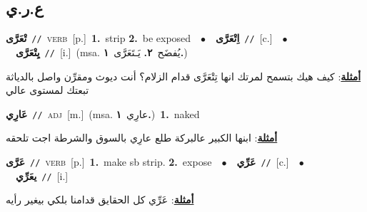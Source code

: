 \documentclass[10pt,a4paper,twoside]{article} %
\begin{document}
\begin{multicols}{2}
\vspace{-3mm}
\subsection*{\color{blue}\foreignlanguage{arabic}{ع.ر.ي}\color{blue}{}} 

{\setlength\topsep{0pt}\textbf{\foreignlanguage{arabic}{تْعَرَّى}}\ {\color{gray}\texttt{//}\color{black}}\ \textsc{verb}\ [p.]\ \textbf{1.}~strip  \textbf{2.}~be exposed\ \ $\bullet$\ \ \setlength\topsep{0pt}\textbf{\foreignlanguage{arabic}{اِتْعَرَّى}}\ {\color{gray}\texttt{//}\color{black}}\ [c.]\ \ $\bullet$\ \ \setlength\topsep{0pt}\textbf{\foreignlanguage{arabic}{يِتْعَرَّى}}\ {\color{gray}\texttt{//}\color{black}}\ [i.]\ \color{gray}(msa. \foreignlanguage{arabic}{يُفضَح}~\foreignlanguage{arabic}{\textbf{٢.}}  \foreignlanguage{arabic}{يَـتَعَرَّى}~\foreignlanguage{arabic}{\textbf{١.}})\color{black}\  \begin{flushright}\color{gray}\foreignlanguage{arabic}{\textbf{\underline{\foreignlanguage{arabic}{أمثلة}}}: كيف هيك بتسمح لمرتك انها تِتْعَرَّى قدام الزلام؟ أنت ديوث ومقرِّن واصل بالدياثة تبعتك لمستوى عالي}\end{flushright}\color{black}} \vspace{2mm}

{\setlength\topsep{0pt}\textbf{\foreignlanguage{arabic}{عَارِي}}\ {\color{gray}\texttt{//}\color{black}}\ \textsc{adj}\ [m.]\ \color{gray}(msa. \foreignlanguage{arabic}{عارِي}~\foreignlanguage{arabic}{\textbf{١.}})\color{black}\ \textbf{1.}~naked\  \begin{flushright}\color{gray}\foreignlanguage{arabic}{\textbf{\underline{\foreignlanguage{arabic}{أمثلة}}}: ابنها الكبير عالبركة طلع عارِي بالسوق والشرطة اجت تلحقه}\end{flushright}\color{black}} \vspace{2mm}

{\setlength\topsep{0pt}\textbf{\foreignlanguage{arabic}{عَرَّى}}\ {\color{gray}\texttt{//}\color{black}}\ \textsc{verb}\ [p.]\ \textbf{1.}~make sb strip.  \textbf{2.}~expose\ \ $\bullet$\ \ \setlength\topsep{0pt}\textbf{\foreignlanguage{arabic}{عَرِّي}}\ {\color{gray}\texttt{//}\color{black}}\ [c.]\ \ $\bullet$\ \ \setlength\topsep{0pt}\textbf{\foreignlanguage{arabic}{يعَرِّي}}\ {\color{gray}\texttt{//}\color{black}}\ [i.]\  \begin{flushright}\color{gray}\foreignlanguage{arabic}{\textbf{\underline{\foreignlanguage{arabic}{أمثلة}}}: عَرِّي كل الحقايق قدامنا بلكي بيغير رأيه}\end{flushright}\color{black}} \vspace{2mm}


\end{multicols}
\end{document}
